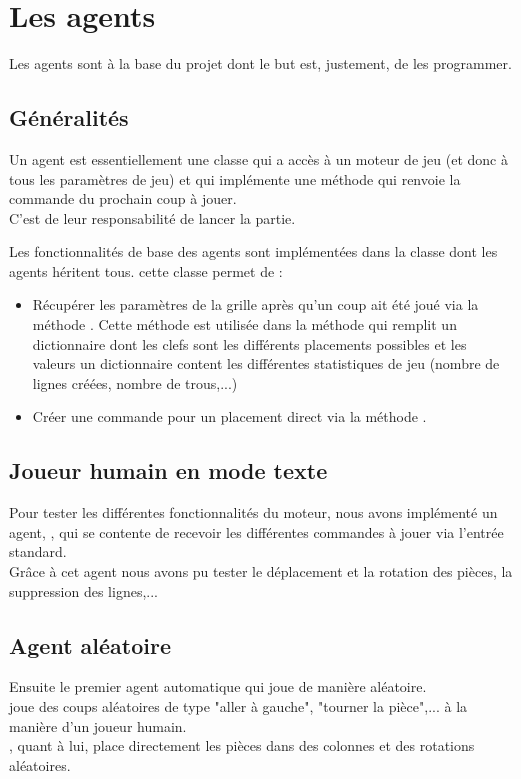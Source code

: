\chapter{Les agents}
Les agents sont à la base du projet dont le but est, justement, de les programmer.

\section{Généralités}
Un agent est essentiellement une classe qui a accès à un moteur de jeu (et donc à tous les paramètres de jeu) et qui implémente une méthode  qui renvoie la commande du prochain coup à jouer. \\
C'est de leur responsabilité de lancer la partie.

Les fonctionnalités de base des agents sont implémentées dans la classe  dont les agents héritent tous. cette classe permet de :
\begin{itemize}
	\item Récupérer les paramètres de la grille après qu'un coup ait été joué via la méthode . Cette méthode est utilisée dans la méthode  qui remplit un dictionnaire dont les clefs sont les différents placements possibles et les valeurs un dictionnaire content les différentes statistiques de jeu (nombre de lignes créées, nombre de trous,...)
	\item Créer une commande pour un placement direct via la méthode .
\end{itemize}

\section{Joueur humain en mode texte}
Pour tester les différentes fonctionnalités du moteur, nous avons implémenté un agent, , qui se contente de recevoir les différentes commandes à jouer via l'entrée standard.\\
Grâce à cet agent nous avons pu tester le déplacement et la rotation des pièces, la suppression des lignes,...

\section{Agent aléatoire}
Ensuite le premier agent automatique qui joue de manière aléatoire. \\
 joue des coups aléatoires de type "aller à gauche", "tourner la pièce",... à la manière d'un joueur humain.\\
, quant à lui, place directement les pièces dans des colonnes et des rotations aléatoires.\\

